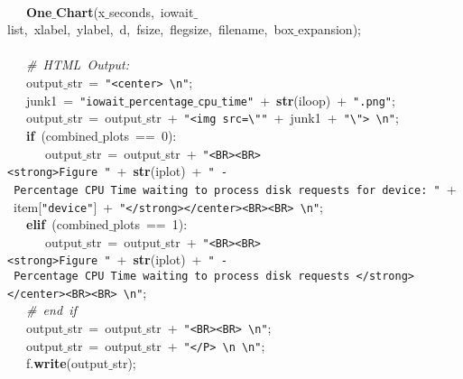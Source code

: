 \mbox{}\ \ \  \\
\mbox{}\ \ \ \textbf{One$\_$Chart}(x$\_$seconds,\ iowait$\_$list,\ xlabel,\ ylabel,\ d,\ fsize,\ flegsize,\ filename,\ box$\_$expansion); \\
\mbox{}\ \ \  \\
\mbox{}\ \ \ \textit{\#\ HTML\ Output:} \\
\mbox{}\ \ \ output$\_$str\ =\ \texttt{"{}\textless{}center\textgreater{}\ \textbackslash{}n"{}}; \\
\mbox{}\ \ \ junk1\ =\ \texttt{"{}iowait$\_$percentage$\_$cpu$\_$time"{}}\ +\ \textbf{str}(iloop)\ +\ \texttt{"{}.png"{}}; \\
\mbox{}\ \ \ output$\_$str\ =\ output$\_$str\ +\ \texttt{"{}\textless{}img\ src=\textbackslash{}"{}"{}}\ +\ junk1\ +\ \texttt{"{}\textbackslash{}"{}\textgreater{}\ \textbackslash{}n"{}}; \\
\mbox{}\ \ \ \textbf{if}\ (combined$\_$plots\ ==\ 0): \\
\mbox{}\ \ \ \ \ \ output$\_$str\ =\ output$\_$str\ +\ \texttt{"{}\textless{}BR\textgreater{}\textless{}BR\textgreater{}\textless{}strong\textgreater{}Figure\ "{}}\ +\ \textbf{str}(iplot)\ +\ \texttt{"{}\ -\ Percentage\ CPU\ Time\ waiting\ to\ process\ disk\ requests\ for\ device:\ "{}}\ +\ item[\texttt{"{}device"{}}]\ +\ \texttt{"{}\textless{}/strong\textgreater{}\textless{}/center\textgreater{}\textless{}BR\textgreater{}\textless{}BR\textgreater{}\ \textbackslash{}n"{}}; \\
\mbox{}\ \ \ \textbf{elif}\ (combined$\_$plots\ ==\ 1): \\
\mbox{}\ \ \ \ \ \ output$\_$str\ =\ output$\_$str\ +\ \texttt{"{}\textless{}BR\textgreater{}\textless{}BR\textgreater{}\textless{}strong\textgreater{}Figure\ "{}}\ +\ \textbf{str}(iplot)\ +\ \texttt{"{}\ -\ Percentage\ CPU\ Time\ waiting\ to\ process\ disk\ requests\ \textless{}/strong\textgreater{}\textless{}/center\textgreater{}\textless{}BR\textgreater{}\textless{}BR\textgreater{}\ \textbackslash{}n"{}}; \\
\mbox{}\ \ \ \textit{\#\ end\ if} \\
\mbox{}\ \ \ output$\_$str\ =\ output$\_$str\ +\ \texttt{"{}\textless{}BR\textgreater{}\textless{}BR\textgreater{}\ \textbackslash{}n"{}}; \\
\mbox{}\ \ \ output$\_$str\ =\ output$\_$str\ +\ \texttt{"{}\textless{}/P\textgreater{}\ \textbackslash{}n\ \textbackslash{}n"{}}; \\
\mbox{}\ \ \ f.\textbf{write}(output$\_$str); \\
